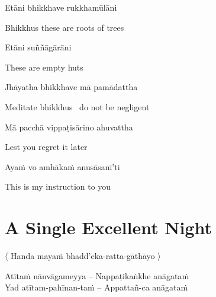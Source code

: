 \begin{twochants}
  Etāni bhikkhave rukkhamūlāni
\end{twochants}

\begin{english}
  Bhikkhus these are roots of trees
\end{english}

\begin{twochants}
  Etāni suññāgārāni
\end{twochants}

\begin{english}
  These are empty huts
\end{english}

\begin{twochants}
  Jhāyatha bhikkhave mā pamādattha
\end{twochants}

\begin{english}
  Meditate bhikkhus \breathmark\ do not be negligent
\end{english}

\begin{twochants}
  Mā pacchā vippaṭisārino ahuvattha
\end{twochants}

\begin{english}
  Lest you regret it later
\end{english}

\begin{twochants}
  Ayaṁ vo amhākaṁ anusāsanī'ti
\end{twochants}

\begin{english}
  This is my instruction to you
\end{english}

\suttaRef{[MN 19]}


\section{A Single Excellent Night}
\label{single-excellent-night}

\begin{leader}
  〈 Handa mayaṁ bhadd'eka-ratta-gāthāyo 〉

\end{leader}

\begin{twochants}
  Atītaṁ nānvāgameyya – Nappaṭikaṅkhe anāgataṁ\\
  Yad atītam-pahīnan-taṁ – Appattañ-ca anāgataṁ\\
\end{twochants}

